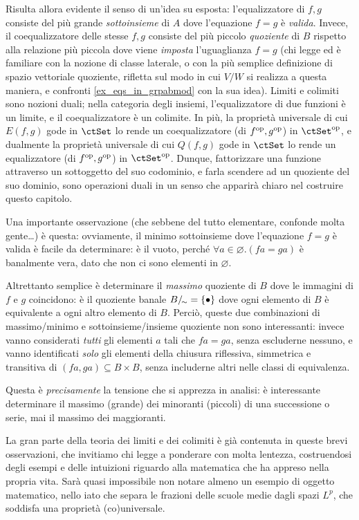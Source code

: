 Risulta allora evidente il senso di un'idea su esposta: l'equalizzatore di \(f,g\) consiste del più grande \emph{sottoinsieme} di \(A\) dove l'equazione \(f=g\) è \emph{valida}. Invece, il coequalizzatore delle stesse \(f,g\) consiste del più piccolo \emph{quoziente} di \(B\) rispetto alla relazione più piccola dove viene \emph{imposta} l'uguaglianza \(f=g\) (chi legge ed è familiare con la nozione di classe laterale, o con la più semplice definizione di spazio vettoriale quoziente, rifletta sul modo in cui \(V/W\) si realizza a questa maniera, e confronti \ref{ex_eqs_in_grpabmod} con la sua idea). Limiti e colimiti sono nozioni duali; nella categoria degli insiemi, l'equalizzatore di due funzioni è un limite, e il coequalizzatore è un colimite. In più, la proprietà universale di cui $E(f,g)$ gode in $\ctSet$ lo rende un coequalizzatore (di $f^{\text{op}},g^{\text{op}}$) in $\ctSet^\op$, e dualmente la proprietà universale di cui $Q(f,g)$ gode in $\ctSet$ lo rende un equalizzatore (di $f^{\text{op}},g^{\text{op}}$) in $\ctSet^\op$. Dunque, fattorizzare una funzione attraverso un sottoggetto del suo codominio, e farla scendere ad un quoziente del suo dominio, sono operazioni duali in un senso che apparirà chiaro nel costruire questo capitolo. 
\begin{remark}\label{minimo_dei_minoranti_is_boring}
 Una importante osservazione (che sebbene del tutto elementare, confonde molta gente\dots) è questa: ovviamente, il minimo sottoinsieme dove l'equazione \(f=g\) è valida è facile da determinare: è il vuoto, perché \(\forall a\in\varnothing.(fa=ga)\) è banalmente vera, dato che non ci sono elementi in $\varnothing$. 
 
 Altrettanto semplice è determinare il \emph{massimo} quoziente di \(B\) dove le immagini di \(f\) e \(g\) coincidono: è il quoziente banale \(B/_{\!\sim} = \{\bullet\}\) dove ogni elemento di \(B\) è equivalente a ogni altro elemento di \(B\). Perciò, queste due combinazioni di massimo/minimo e sottoinsieme/insieme quoziente non sono interessanti: invece vanno considerati \emph{tutti} gli elementi \(a\) tali che \(fa=ga\), senza escluderne nessuno, e vanno identificati \emph{solo} gli elementi della chiusura riflessiva, simmetrica e transitiva di \((fa,ga)\subseteq B\times B\), senza includerne altri nelle classi di equivalenza.

 Questa è \emph{precisamente} la tensione che si apprezza in analisi: è interessante determinare il massimo (grande) dei minoranti (piccoli) di una successione o serie, mai il massimo dei maggioranti.
\end{remark}
La gran parte della teoria dei limiti e dei colimiti è già contenuta in queste brevi osservazioni, che invitiamo chi legge a ponderare con molta lentezza, costruendosi degli esempi e delle intuizioni riguardo alla matematica che ha appreso nella propria vita. Sarà quasi impossibile non notare almeno un esempio di oggetto matematico, nello iato che separa le frazioni delle scuole medie dagli spazi $L^p$, che soddisfa una proprietà (co)universale.

